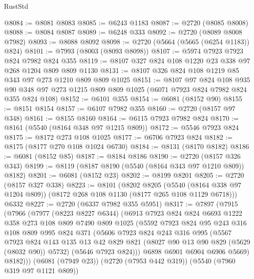 \begin{lexlean}{RustStd}
\begin{coremodule}
@8084 := @8081 @8083
@8085 := @6243 @1183
@8087 := @2720 (@8085 @8008)
@8088 := @8084 @8087
@8089 := @6248 @333
@8092 := @2720 (@8089 @8008 @7982)
@8093 := @8088 @8092
@8098 := @2720 (@5664 (@5665 (@6254 @1183)) @824)
@8101 := @7993 (@8003 (@8093 @8098))
@8107 := @5974 @7923 @7923 @824 @7982 @824 @355
@8119 := @8107 @327 @824 @108 @1220 @23 @338 @97 @268 @1204 @809 @809 @1130
@8131 := @8107 @326 @824 @108 @1219 @85 @343 @97 @273 @1210 @809 @809 @1025
@8151 := @8107
    @97
    @824
    @108
    @935
    @90
    @348
    @97
    @273
    @1215
    @809
    @809
    @1025
    (@6071 @7923 @824 @7982 @824 @355 @824 @108)
@8152 := @6101 @355
@8154 := @6081 (@8152 @90)
@8155 := @8151 @8154
@8157 := @6107 @7982 @355
@8160 := @2720 (@8157 @97 @348)
@8161 := @8155 @8160
@8164 := @6115 @7923 @7982 @824
@8170 := @8161 (@5540 (@8164 @348 @97 @1215 @809))
@8172 := @5546 @7923 @824
@8175 := @8172 @273 @108 @1025
@8177 := @6706 @7923 @824
@8182 := @8175 (@8177 @270 @108 @1024 @6730)
@8184 := @8131 (@8170 @8182)
@8186 := @6081 (@8152 @85)
@8187 := @8184 @8186
@8190 := @2720 (@8157 @326 @343)
@8199 := @8119 (@8187 @8190 (@5540 (@8164 @343 @97 @1210 @809)) @8182)
@8201 := @6081 (@8152 @23)
@8202 := @8199 @8201
@8205 := @2720 (@8157 @327 @338)
@8223 := @8101
    (@8202
      @8205
      (@5540 (@8164 @338 @97 @1204 @809))
      (@8172 @268 @108 @1130 (@8177 @265 @108 @1129 @6718)))
    @6332
@8227 := @2720 (@6337 @7982 @355 @5951)
@8317 := @7897
    (@7915
      (@7966
        (@7977
          (@8223 @8227 @6344)
          (@6913
            @7923
            @824
            @824
            @6693
            @1222
            @358
            @273
            @108
            @809
            @7490
            @809
            @1025
            (@5592
              @7923
              @824
              @95
              @243
              @316
              @108
              @809
              @995
              @824
              @371
              (@5606
                @7923
                @824
                @243
                @316
                @995
                (@5567
                  @7923
                  @824
                  @143
                  @135
                  @13
                  @42
                  @829
                  @821
                  (@8027 @90 @13 @90 @829 (@5629 (@8032 @90)) @5732)
                  (@5646 @7923 @824)))
              @6898
              @6901
              @6904
              @6906
              @5669)
            @8182)))
      (@6081 (@7949 @23))
      (@2720 (@7953 @442 @319))
      (@5540 (@7960 @319 @97 @1121 @809))

\end{coremodule}
\end{lexlean}
